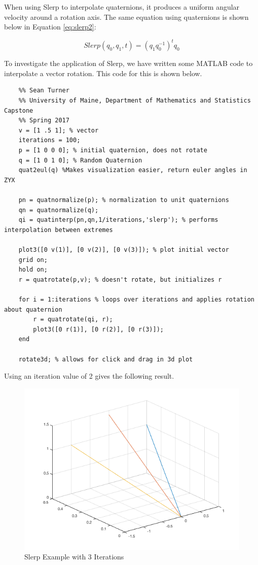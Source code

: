 When using Slerp to interpolate quaternions, it produces a uniform angular velocity around a rotation axis.
The same equation using quaternions is shown below in Equation \ref{eq:slerp2}:

\begin{equation}
	Slerp(q_0, q_1, t) = (q_1q_0^{-1})^tq_0
\label{eq:slerp2}
\end{equation}

To investigate the application of Slerp, we have written some MATLAB code to interpolate a vector rotation.
This code for this is shown below.

\begin{verbatim}
	%% Sean Turner
	%% University of Maine, Department of Mathematics and Statistics Capstone
	%% Spring 2017
	v = [1 .5 1]; % vector
	iterations = 100;
	p = [1 0 0 0]; % initial quaternion, does not rotate
	q = [1 0 1 0]; % Random Quaternion
	quat2eul(q) %Makes visualization easier, return euler angles in ZYX

	pn = quatnormalize(p); % normalization to unit quaternions
	qn = quatnormalize(q);
	qi = quatinterp(pn,qn,1/iterations,'slerp'); % performs interpolation between extremes

	plot3([0 v(1)], [0 v(2)], [0 v(3)]); % plot initial vector
	grid on;
	hold on;
	r = quatrotate(p,v); % doesn't rotate, but initializes r

	for i = 1:iterations % loops over iterations and applies rotation about quaternion
	    r = quatrotate(qi, r);
	    plot3([0 r(1)], [0 r(2)], [0 r(3)]);
	end

	rotate3d; % allows for click and drag in 3d plot
\end{verbatim}

Using an iteration value of 2 gives the following result.

\begin{figure}[H]
\centering
\includegraphics[width = .75\textwidth]{Figures/slerp2.png}
\caption{Slerp Example with 3 Iterations}
\label{fig:slerp3}
\end{figure}

